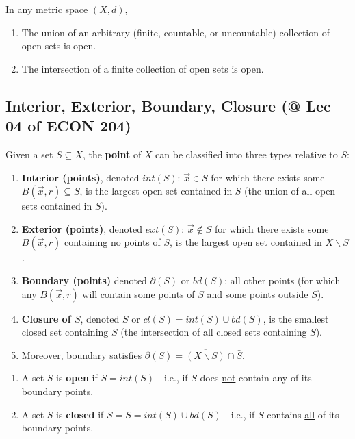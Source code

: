 \documentclass[11pt]{elegantbook}
\begin{document}
\begin{theorem}
    In any metric space $(X, d)$,
    \begin{enumerate}
        \item The union of an arbitrary (finite, countable, or uncountable) collection of open sets is open.
        \item The intersection of a finite collection of open sets is open.
    \end{enumerate}
\end{theorem}

\subsection{Interior, Exterior, Boundary, Closure \small{(@ Lec 04 of ECON 204)}}
Given a set $S\subseteq X$, the \textbf{point} of $X$ can be classified into three types relative to $S$:
\begin{enumerate}[$\bullet$]
    \item \textbf{Interior (points)}, denoted $int(S)$: $\vec{x}\in S$ for which there exists some $B(\vec{x},r)\subseteq S$, is the largest open set contained in $S$ (the union of all open sets contained in $S$).
    \item \textbf{Exterior (points)}, denoted $ext(S)$: $\vec{x}\notin S$ for which there exists some $B(\vec{x},r)$ containing \underline{no} points of $S$, is the largest open set contained in $X \backslash S$.
    \item \textbf{Boundary (points)} denoted $\partial (S)$ or $bd(S)$: all other points (for which any $B(\vec{x},r)$ will contain some points of $S$ and some points outside $S$).
    \item \textbf{Closure of $S$}, denoted $\bar{S}$ or $cl(S)=int(S)\cup bd(S)$,  is the smallest closed set containing $S$ (the intersection of all closed sets containing $S$).
    \item Moreover, boundary satisfies $\partial (S)=\overline{(X\backslash S)}\cap\bar{S}$.
\end{enumerate}

\begin{enumerate}[(1)]
    \item A set $S$ is \textbf{open} if $S=int(S)$ - i.e., if $S$ does \underline{not} contain any of its boundary points.
    \item A set $S$ is \textbf{closed} if $S=\bar{S}=int(S)\cup bd(S)$ - i.e., if $S$ contains \underline{all} of its boundary points.
\end{enumerate}
\end{document}
